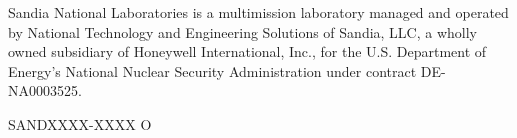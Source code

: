 \documentclass[letterpaper]{scrartcl}
\begin{document}
\vspace*{\fill}
\noindent
Sandia National Laboratories is a multimission laboratory managed and
operated by National Technology and Engineering Solutions of Sandia,
LLC, a wholly owned subsidiary of Honeywell International, Inc., for
the U.S. Department of Energy's National Nuclear Security
Administration under contract DE-NA0003525.

SANDXXXX-XXXX O
\end{document}
